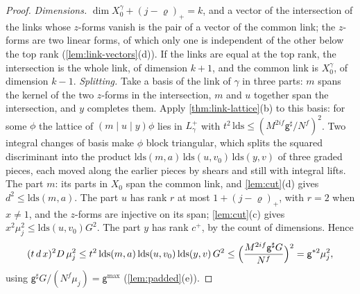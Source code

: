 \begin{proof}
\emph{Dimensions.} $\dim X_0^\gamma+(j-\varrho)_+=k$, and a vector of the intersection of the links whose $z$-forms vanish is the pair of a vector of the common link; the $z$-forms are two linear forms, of which only one is
independent of the other below the top rank (\cref{lem:link-vectors}(d)). If the links are equal at the top rank, the intersection is the whole link, of dimension $k+1$, and the common link is $X_0^\gamma$, of dimension $k-1$.
\emph{Splitting.} Take a basis of the link of $\gamma$ in three parts: $m$ spans the kernel of the two $z$-forms in the intersection, $m$ and $u$ together span the intersection, and $y$ completes them. Apply
\cref{thm:link-lattice}(b) to this basis: for some $\phi$ the lattice of $(m\mid u\mid y)\phi$ lies in $L^+_\gamma$ with $t^2\,\mathrm{lds}\le(M^{2if}\mathsf g^\sharp/N^f)^2$. Two integral changes of basis make $\phi$ block
triangular, which splits the squared discriminant into the product $\mathrm{lds}(m,a)\,\mathrm{lds}(u,v_0)\,\mathrm{lds}(y,v)$ of three graded pieces, each moved along the earlier pieces by shears and still with integral lifts.
The part $m$: its parts in $X_0$ span the common link, and \cref{lem:cut}(d) gives $d^2\le\mathrm{lds}(m,a)$. The part $u$ has rank $r$ at most $1+(j-\varrho)_+$, with $r=2$ when $x\ne1$, and the $z$-forms are injective on its span;
\cref{lem:cut}(c) gives $x^2\mu_j^2\le\mathrm{lds}(u,v_0)G^2$. The part $y$ has rank $c^+$, by the count of dimensions. Hence
\[
  (t\,d\,x)^2D\,\mu_j^2\le t^2\,\mathrm{lds}(m,a)\,\mathrm{lds}(u,v_0)\,\mathrm{lds}(y,v)\,G^2\le\Bigl(\frac{M^{2if}\mathsf g^\sharp G}{N^f}\Bigr)^2=\mathsf g^{*2}\mu_j^2,
\]
using $\mathsf g^\sharp G/(N^f\mu_j)=\mathsf g^{\max}$ (\cref{lem:padded}(e)).
\end{proof}

